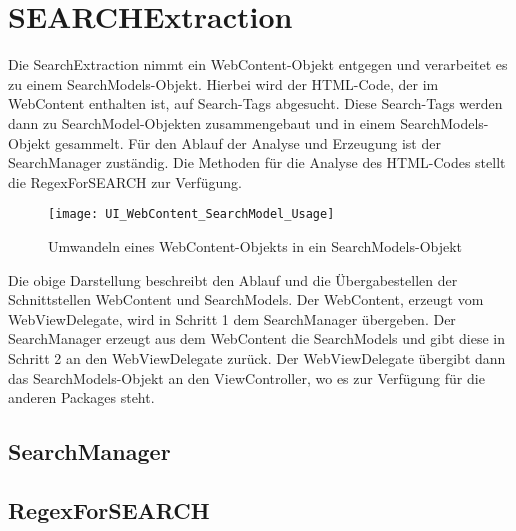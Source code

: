 
\section{SEARCHExtraction}
Die SearchExtraction nimmt ein WebContent-Objekt entgegen und verarbeitet es zu einem SearchModels-Objekt. Hierbei wird der HTML-Code, der im WebContent enthalten ist, auf Search-Tags abgesucht. Diese Search-Tags werden dann zu SearchModel-Objekten zusammengebaut und in einem SearchModels-Objekt gesammelt.\newline
Für den Ablauf der Analyse und Erzeugung ist der SearchManager zuständig. Die Methoden für die Analyse des HTML-Codes stellt die RegexForSEARCH zur Verfügung.

\begin{figure}[h]
	\centering
	\texttt{[image: UI\_WebContent\_SearchModel\_Usage]}
	\caption{Umwandeln eines WebContent-Objekts in ein SearchModels-Objekt}
	\label{fig:WebContent zu SearchModels}
\end{figure}

Die obige Darstellung beschreibt den Ablauf und die Übergabestellen der Schnittstellen WebContent und SearchModels. Der WebContent, erzeugt vom WebViewDelegate, wird in Schritt 1 dem SearchManager übergeben. Der SearchManager erzeugt aus dem WebContent die SearchModels und gibt diese in Schritt 2 an den WebViewDelegate zurück. Der WebViewDelegate übergibt dann das SearchModels-Objekt an den ViewController, wo es zur Verfügung für die anderen Packages steht.

\subsection{SearchManager}
\subsection{RegexForSEARCH}

